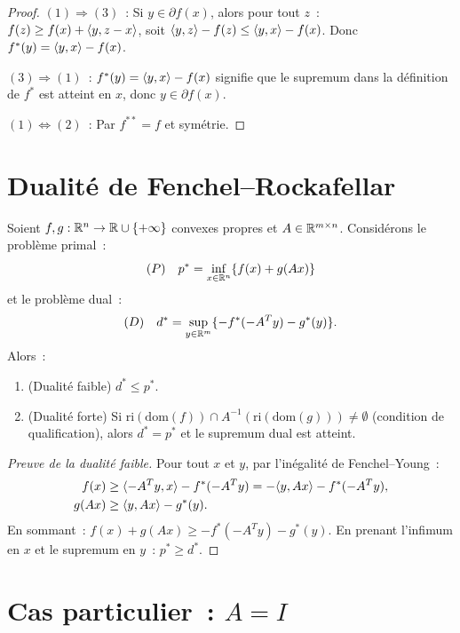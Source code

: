 \begin{proof}
$(1) \Rightarrow (3)$~: Si $y \in \partial f(x)$, alors pour tout $z$~:
$f(z) \geq f(x) + \langle y, z-x \rangle$, soit $\langle y, z \rangle - f(z) \leq \langle y, x \rangle - f(x)$.
Donc $f^*(y) = \langle y, x \rangle - f(x)$.

$(3) \Rightarrow (1)$~: $f^*(y) = \langle y, x \rangle - f(x)$ signifie que le supremum dans
la d\'efinition de $f^*$ est atteint en $x$, donc $y \in \partial f(x)$.

$(1) \Leftrightarrow (2)$~: Par $f^{**} = f$ et sym\'etrie.
\end{proof}

\section{Dualit\'e de Fenchel--Rockafellar}

\begin{theoreme}
\label{thm:fenchel_rockafellar}
Soient $f, g : \mathbb{R}^n \to \mathbb{R} \cup \{+\infty\}$ convexes propres et $A \in \mathbb{R}^{m \times n}$.
Consid\'erons le probl\`eme primal~:
\[
    (P) \quad p^* = \inf_{x \in \mathbb{R}^n} \{f(x) + g(Ax)\}
\]
et le probl\`eme dual~:
\[
    (D) \quad d^* = \sup_{y \in \mathbb{R}^m} \{-f^*(-A^Ty) - g^*(y)\}.
\]
Alors~:
\begin{enumerate}
    \item (Dualit\'e faible) $d^* \leq p^*$.
    \item (Dualit\'e forte) Si $\mathrm{ri}(\mathrm{dom}(f)) \cap
          A^{-1}(\mathrm{ri}(\mathrm{dom}(g))) \neq \emptyset$ (condition de
          qualification), alors $d^* = p^*$ et le supremum dual est atteint.
\end{enumerate}
\end{theoreme}

\begin{proof}[Preuve de la dualit\'e faible]
Pour tout $x$ et $y$, par l'in\'egalit\'e de Fenchel--Young~:
\begin{align*}
    f(x) &\geq \langle -A^Ty, x \rangle - f^*(-A^Ty) = -\langle y, Ax \rangle - f^*(-A^Ty), \\
    g(Ax) &\geq \langle y, Ax \rangle - g^*(y).
\end{align*}
En sommant~: $f(x) + g(Ax) \geq -f^*(-A^Ty) - g^*(y)$.
En prenant l'infimum en $x$ et le supremum en $y$~: $p^* \geq d^*$.
\end{proof}

\section{Cas particulier~: $A = I$}

